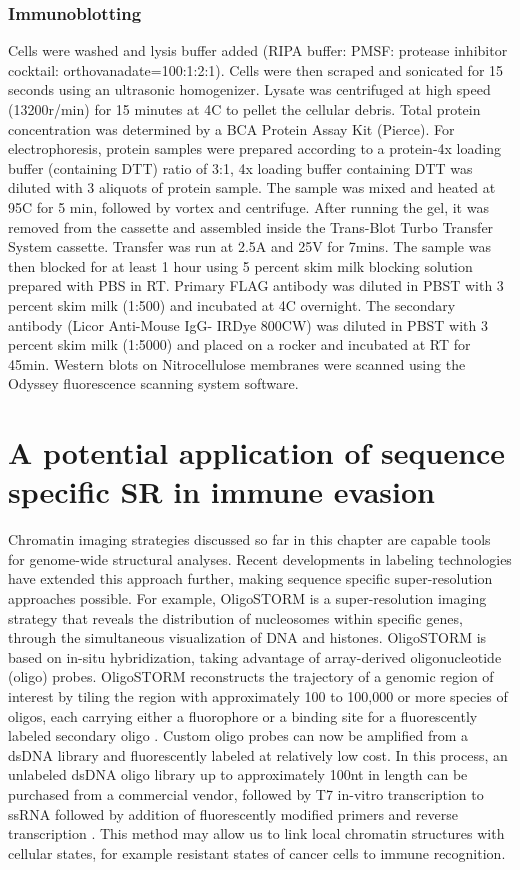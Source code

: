 \subsubsection{Immunoblotting}
Cells were washed and lysis buffer added (RIPA buffer: PMSF: protease inhibitor cocktail: orthovanadate=100:1:2:1). Cells were then scraped and sonicated for 15 seconds using an ultrasonic homogenizer. Lysate was centrifuged at high speed (13200r/min) for 15 minutes at 4C to pellet the cellular debris. Total protein concentration was determined by a BCA Protein Assay Kit (Pierce). For electrophoresis, protein samples were prepared according to a protein-4x loading buffer (containing DTT) ratio of 3:1, 4x loading buffer containing DTT was diluted with 3 aliquots of protein sample. The sample was mixed and heated at 95C for 5 min, followed by vortex and centrifuge. After running the gel, it was removed from the cassette and assembled inside the Trans-Blot Turbo Transfer System cassette. Transfer was run at 2.5A and 25V for 7mins. The sample was then blocked for at least 1 hour using 5 percent skim milk blocking solution prepared with PBS in RT. Primary FLAG antibody was diluted in PBST with 3 percent skim milk (1:500) and incubated at 4C overnight. The secondary antibody (Licor Anti-Mouse IgG- IRDye 800CW) was diluted in PBST with 3 percent skim milk (1:5000) and placed on a rocker and incubated at RT for 45min. Western blots on Nitrocellulose membranes were scanned using the Odyssey fluorescence scanning system software.

\section{A potential application of sequence specific SR in immune evasion}

Chromatin imaging strategies discussed so far in this chapter are capable tools for genome-wide structural analyses. Recent developments in labeling technologies have extended this approach further, making sequence specific super-resolution approaches possible. For example, OligoSTORM \parencite{Beliveau2017} is a super-resolution imaging strategy that reveals the distribution of nucleosomes within specific genes, through the simultaneous visualization of DNA and histones. OligoSTORM is based on in-situ hybridization, taking advantage of array-derived oligonucleotide (oligo) probes. OligoSTORM reconstructs the trajectory of a genomic region of interest by tiling the region with approximately 100 to 100,000 or more species of oligos, each carrying either a fluorophore or a binding site for a fluorescently labeled secondary oligo \parencite{Boettiger2016, Beliveau2017}. Custom oligo probes can now be amplified from a dsDNA library and fluorescently labeled at relatively low cost. In this process, an unlabeled dsDNA oligo library up to approximately 100nt in length can be purchased from a commercial vendor, followed by T7 in-vitro transcription to ssRNA followed by addition of fluorescently modified primers and reverse transcription \parencite{Murgha2015,Boettiger2020}. This method may allow us to link local chromatin structures with cellular states, for example resistant states of cancer cells to immune recognition.

